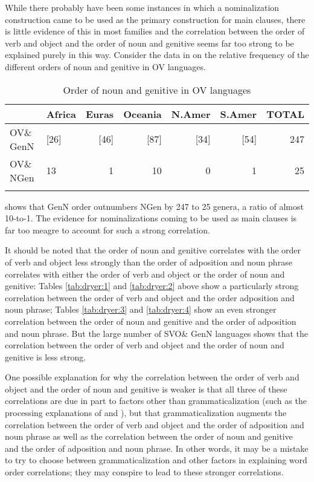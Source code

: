 \documentclass[output=paper]{langsci/langscibook}
\begin{document}
While there probably have been some instances in which a nominalization construction came to be used as the primary construction for main clauses, there is little evidence of this in most families and the correlation between the order of verb and object and the order of noun and genitive seems far too strong to be explained purely in this way. Consider the data in  on the relative frequency of the different orders of noun and genitive in OV languages.

\begin{table}
\begin{tabularx}{\textwidth}{Xlrrrrr}
\lsptoprule
& \bfseries Africa & \bfseries Euras & \bfseries Oceania & \bfseries N.Amer & \bfseries S.Amer & \bfseries TOTAL\\
\midrule
OV\& GenN & [26] & [46] & [87] & [34] & [54] & 247\\
OV\& NGen & 13 & 1 & 10 & 0 & 1 & 25\\
\lspbottomrule
\end{tabularx}
\caption{\label{tab:dryer:7}Order of noun and genitive in OV languages}
\end{table}

 shows that GenN order outnumbers NGen by 247 to 25 genera, a ratio of almost 10-to-1. The evidence for nominalizations coming to be used as main clauses is far too meagre to account for such a strong correlation.

It should be noted that the order of noun and genitive correlates with the order of verb and object less strongly than the order of adposition and noun phrase correlates with either the order of verb and object or the order of noun and genitive: Tables \ref{tab:dryer:1} and \ref{tab:dryer:2} above show a particularly strong correlation between the order of verb and object and the order adposition and noun phrase; Tables \ref{tab:dryer:3} and \ref{tab:dryer:4} show an even stronger correlation between the order of noun and genitive and the order of adposition and noun phrase. But the large number of SVO\& GenN languages shows that the correlation between the order of verb and object and the order of noun and genitive is less strong.

One possible explanation for why the correlation between the order of verb and object and the order of noun and genitive is weaker is that all three of these correlations are due in part to factors other than grammaticalization (such as the processing explanations of \citealt{Dryer1992} and \citealt{Hawkins1994,Hawkins2004,Hawkins2014}), but that grammaticalization augments the correlation between the order of verb and object and the order of adposition and noun phrase as well as the correlation between the order of noun and genitive and the order of adposition and noun phrase. In other words, it may be a mistake to try to choose between grammaticalization and other factors in explaining word order correlations; they may conspire to lead to these stronger correlations.
\end{document}
